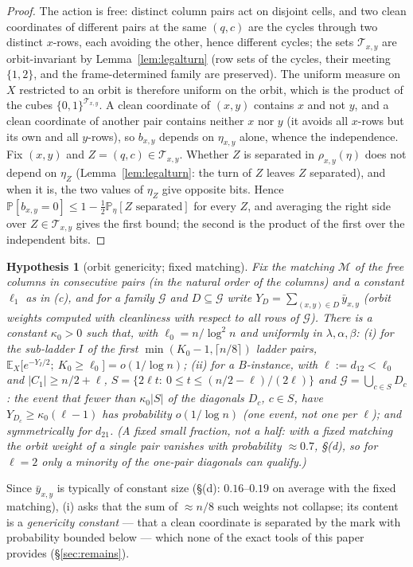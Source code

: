 \documentclass[11pt]{article}
\newtheorem{hypothesis}[theorem]{Hypothesis}
\theoremstyle{definition}
\newcommand{\E}{\mathbb{E}}
\renewcommand{\Pr}{\mathbb{P}}
\begin{document}
\begin{proof}
The action is free: distinct column pairs act on disjoint cells, and
two clean coordinates of different pairs at the same $(q,c)$ are the
cycles through two distinct $x$-rows, each avoiding the other, hence
different cycles; the sets $\mathcal T_{x,y}$ are orbit-invariant by
Lemma~\ref{lem:legalturn} (row sets of the cycles, their meeting
$\{1,2\}$, and the frame-determined family are preserved).  The
uniform measure on $X$ restricted to an orbit is therefore uniform on
the orbit, which is the product of the cubes
$\{0,1\}^{\mathcal T_{x,y}}$.  A clean coordinate of $(x,y)$ contains
$x$ and not $y$, and a clean coordinate of another pair contains
neither $x$ nor $y$ (it avoids all $x$-rows but its own and all
$y$-rows), so $b_{x,y}$ depends on $\eta_{x,y}$ alone, whence the
independence.  Fix $(x,y)$ and
$Z=(q,c)\in\mathcal T_{x,y}$.  Whether $Z$ is separated in
$\rho_{x,y}(\eta)$ does not depend on $\eta_Z$
(Lemma~\ref{lem:legalturn}: the turn of $Z$ leaves $Z$ separated), and
when it is, the two values of $\eta_Z$ give opposite bits.  Hence
$\Pr[b_{x,y}=0]\le1-\tfrac12\Pr_\eta[Z\text{ separated}]$ for every
$Z$, and averaging the right side over $Z\in\mathcal T_{x,y}$ gives
the first bound; the second is the product of the first over the
independent bits.
\end{proof}



\begin{hypothesis}[orbit genericity; fixed matching]\label{hyp:orbitgen}
Fix the matching $\mathcal M$ of the free columns in consecutive pairs (in the natural
order of the columns) and a constant $\ell_1$ as in (c),
and for a family $\mathcal G$ and $D\subseteq\mathcal G$ write
$Y_D=\sum_{(x,y)\in D}\bar y_{x,y}$ (orbit weights computed with cleanliness with respect to
all rows of $\mathcal G$).  There is a constant $\kappa_0>0$ such that, with
$\ell_0=n/\log^2n$ and uniformly in $\lambda,\alpha,\beta$: (i) for the sub-ladder $I$ of
the first $\min(K_0-1,\lceil n/8\rceil)$ ladder pairs,
$\E_X\bigl[e^{-Y_I/2};\ K_0\ge\ell_0\bigr]=o(1/\log n)$; (ii) for a $B$-instance, with
$\ell:=d_{12}<\ell_0$ and $|C_1|\ge n/2+\ell$, $S=\{2\ell t:\ 0\le t\le(n/2-\ell)/(2\ell)\}$
and $\mathcal G=\bigcup_{c\in S}D_c$: the event that fewer than $\kappa_0|S|$ of the
diagonals $D_c$, $c\in S$, have $Y_{D_c}\ge\kappa_0(\ell-1)$ has probability $o(1/\log n)$
(one event, not one per $\ell$); and symmetrically for $d_{21}$.  (A fixed small fraction,
not a half: with a fixed matching the orbit weight of a single pair vanishes with
probability $\approx0.7$, \S(d), so for $\ell=2$ only a minority of the one-pair diagonals can
qualify.)
\end{hypothesis}
\noindent Since $\bar y_{x,y}$ is typically of constant size (\S(d): $0.16$--$0.19$ on
average with the fixed matching), (i) asks that the sum of $\approx n/8$ such weights not collapse; its content is a
\emph{genericity constant} --- that a clean coordinate is separated by the mark with
probability bounded below --- which none of the exact tools of this paper provides
(\S\ref{sec:remains}).
\end{document}
